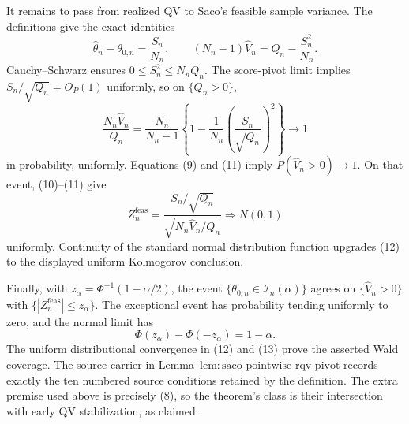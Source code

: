 It remains to pass from realized QV to Saco's feasible sample variance.  The definitions give the exact identities
\[
\widehat\theta_n-\theta_{0,n}=\frac{S_n}{N_n},\qquad
(N_n-1)\widehat V_n=Q_n-\frac{S_n^2}{N_n}.
\tag{10}
\]
Cauchy--Schwarz ensures \(0\le S_n^2\le N_nQ_n\).  The score-pivot limit implies \(S_n/\sqrt{Q_n}=O_P(1)\) uniformly, so on \(\{Q_n>0\}\),
\[
\frac{N_n\widehat V_n}{Q_n}
=\frac{N_n}{N_n-1}\left\{1-\frac1{N_n}\left(\frac{S_n}{\sqrt{Q_n}}\right)^2\right\}\longrightarrow1
\tag{11}
\]
in probability, uniformly.  Equations (9) and (11) imply \(P(\widehat V_n>0)\to1\).  On that event, (10)--(11) give
\[
Z_n^{\mathrm{feas}}
=\frac{S_n/\sqrt{Q_n}}{\sqrt{N_n\widehat V_n/Q_n}}\Rightarrow N(0,1)
\tag{12}
\]
uniformly.  Continuity of the standard normal distribution function upgrades (12) to the displayed uniform Kolmogorov conclusion.

Finally, with \(z_\alpha=\Phi^{-1}(1-\alpha/2)\), the event \(\{\theta_{0,n}\in\mathcal I_n(\alpha)\}\) agrees on \(\{\widehat V_n>0\}\) with \(\{|Z_n^{\mathrm{feas}}|\le z_\alpha\}\).  The exceptional event has probability tending uniformly to zero, and the normal limit has
\[
\Phi(z_\alpha)-\Phi(-z_\alpha)=1-\alpha.
\tag{13}
\]
The uniform distributional convergence in (12) and (13) prove the asserted Wald coverage.  The source carrier in Lemma~\(\mathrm{lem:saco\text{-}pointwise\text{-}rqv\text{-}pivot}\) records exactly the ten numbered source conditions retained by the definition.  The extra premise used above is precisely (8), so the theorem's class is their intersection with early QV stabilization, as claimed.